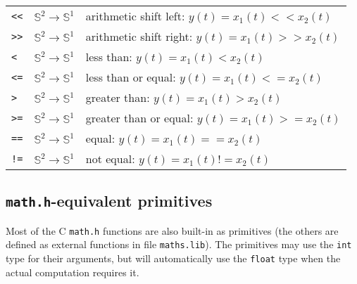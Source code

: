 \begin{tabular}{|l|l|l|}
	\texttt{<}\texttt{<} & $\mathbb{S}^{2}\rightarrow\mathbb{S}^{1}$ & arithmetic shift left: $y(t)=x_{1}(t) << x_{2}(t)$       \\
	\texttt{>}\texttt{>} & $\mathbb{S}^{2}\rightarrow\mathbb{S}^{1}$ & arithmetic shift right: $y(t)=x_{1}(t) >> x_{2}(t)$      \\


	\texttt{<}           & $\mathbb{S}^{2}\rightarrow\mathbb{S}^{1}$ & less than: $y(t)=x_{1}(t) < x_{2}(t)$                    \\
	\texttt{<=}          & $\mathbb{S}^{2}\rightarrow\mathbb{S}^{1}$ & less than or equal: $y(t)=x_{1}(t) <= x_{2}(t)$          \\
	\texttt{>}           & $\mathbb{S}^{2}\rightarrow\mathbb{S}^{1}$ & greater than: $y(t)=x_{1}(t) > x_{2}(t)$                 \\
	\texttt{>=}          & $\mathbb{S}^{2}\rightarrow\mathbb{S}^{1}$ & greater than or equal: $y(t)=x_{1}(t) >= x_{2}(t)$       \\
	\texttt{==}          & $\mathbb{S}^{2}\rightarrow\mathbb{S}^{1}$ & equal: $y(t)=x_{1}(t) == x_{2}(t)$                       \\
	\texttt{!=}          & $\mathbb{S}^{2}\rightarrow\mathbb{S}^{1}$ & not equal: $y(t)=x_{1}(t) != x_{2}(t)$                   \\

	\hline
\end{tabular}

\bigskip

\subsection{\texttt{math.h}-equivalent primitives}

Most of the C \texttt{math.h} functions are also built-in as primitives (the others are defined as external functions in file \texttt{maths.lib}).
The primitives may use the \texttt{int} type for their arguments, but will automatically use the \texttt{float} type when the actual computation requires it.

\bigskip

